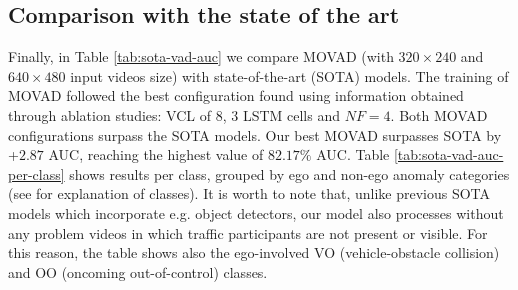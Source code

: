 \subsection{Comparison with the state of the art}
\label{comparison-with-sota}
Finally, in Table \ref{tab:sota-vad-auc} we compare MOVAD (with $320\times240$ and $640\times480$ input videos size) with state-of-the-art (SOTA) models.
The training of MOVAD followed the best configuration found using information obtained through ablation studies: VCL of 8, 3 LSTM cells and $\mathit{NF}=4$.
Both MOVAD configurations surpass the SOTA models.
Our best MOVAD surpasses SOTA by +$2.87$ AUC, reaching the highest value of $82.17\%$ AUC.
Table \ref{tab:sota-vad-auc-per-class} shows results per class, grouped by ego and non-ego anomaly categories (see \cite{9712446} for explanation of classes).
It is worth to note that, unlike previous SOTA models which incorporate e.g. object detectors, our model also processes without any problem videos in which traffic participants are not present or visible. %
For this reason, the table shows also the ego-involved VO (vehicle-obstacle collision) and OO (oncoming out-of-control) classes.
